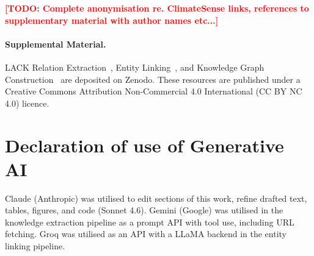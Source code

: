 \documentclass[runningheads]{llncs}
\newcommand{\todo}[1]{\textcolor{red}{\textbf{[TODO: #1]}}}
\begin{document}
\todo{Complete anonymisation re. ClimateSense links, references to supplementary material with author names etc...}











\paragraph{Supplemental Material.}
LACK Relation Extraction~\cite{lack-re}, Entity Linking~\cite{lack-el}, and Knowledge Graph Construction~\cite{lack-kgc} are deposited on Zenodo.
These resources are published under a Creative Commons Attribution Non-Commercial 4.0 International (CC BY NC 4.0) licence.

\clearpage
\section*{Declaration of use of Generative AI}

Claude (Anthropic) was utilised to edit sections of this work, refine drafted text, tables, figures, and code (Sonnet 4.6). Gemini (Google) was utilised in the knowledge extraction pipeline as a prompt API with tool use, including URL fetching. Groq was utilised as an API with a LLaMA backend in the entity linking pipeline. %


\end{document}
